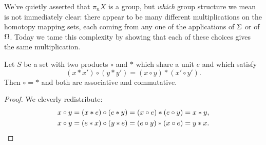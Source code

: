 We've quietly asserted that $\pi_n X$ is a group, but \emph{which} group structure we mean is not immediately clear: there appear to be many different multiplications on the homotopy mapping sets, each coming from any one of the applications of $\Sigma$ or of $\Omega$.
Today we tame this complexity by showing that each of these choices gives the same multiplication.

\begin{lemma}\label{EckmannHilton}%
Let $S$ be a set with two products $\circ$ and $*$ which share a unit $e$ and which satisfy \[(x * x') \circ (y * y') = (x \circ y) * (x' \circ y').\]  Then $\circ = *$ and both are associative and commutative.
\end{lemma}
\begin{proof}
We cleverly redistribute:
\begin{align*}
x \circ y & = (x * e) \circ (e * y) = (x \circ e) * (e \circ y) = x * y, \\
x \circ y & = (e * x) \circ (y * e) = (e \circ y) * (x \circ e) = y * x. \qedhere
\end{align*}
\end{proof}


